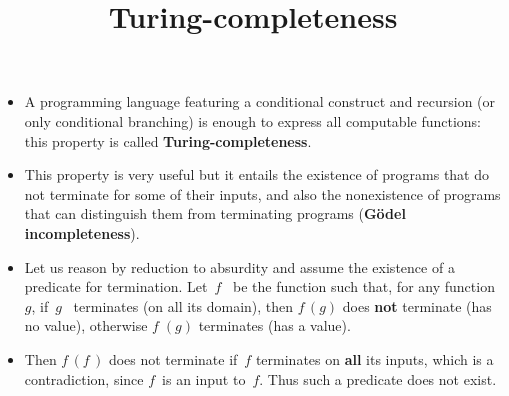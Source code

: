 \documentclass[wide]{slides}
\begin{document}
\begin{slide}
  \title{Turing-completeness}

  \begin{itemize}

    \item A programming language featuring a conditional construct and
      recursion (or only conditional branching) is enough to express
      all computable functions: this property is called
      \textbf{Turing-completeness}.

    \item This property is very useful but it entails the existence of
      programs that do not terminate for some of their inputs, and
      also the nonexistence of programs that can distinguish them from
      terminating programs (\textbf{G\"odel incompleteness}).

    \item Let us reason by reduction to absurdity and assume the
      existence of a predicate for termination. Let~\(f\) \, be the
      function such that, for any function~\(g\), if~\(g\) \,
      terminates (on all its domain), then \(f \, (g)\) does
      \textbf{not} terminate (has no value), otherwise \(f \; (g)\)
      terminates (has a value).

    \item Then $f\,(f\,)$ does not terminate if~$f$ terminates on
      \textbf{all} its inputs, which is a contradiction, since
      \(f\)~is an input to~\(f\). Thus such a predicate does not
      exist.
  \end{itemize}

\end{slide}
\end{document}
